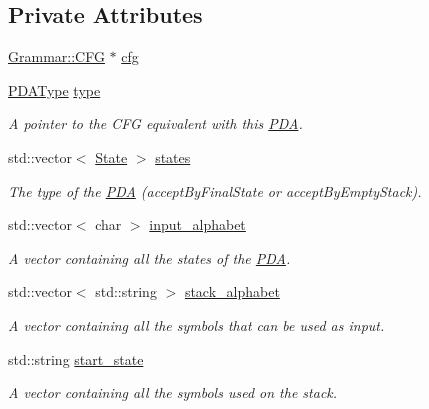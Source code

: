 \subsection*{\-Private \-Attributes}
\begin{DoxyCompactItemize}
\item 
\hyperlink{classGrammar_1_1CFG}{\-Grammar\-::\-C\-F\-G} $\ast$ \hyperlink{classPDA_1_1PDA_af62ce9c2fc33c22ac10cb94be5832cae}{cfg}
\item 
\hyperlink{namespacePDA_a2f2b17cdf30facf6f0fe593ab209acf8}{\-P\-D\-A\-Type} \hyperlink{classPDA_1_1PDA_a15524b46d2be399f384b0f236ccb38f4}{type}
\begin{DoxyCompactList}\small\item\em \-A pointer to the \-C\-F\-G equivalent with this \hyperlink{classPDA_1_1PDA}{\-P\-D\-A}. \end{DoxyCompactList}\item 
std\-::vector$<$ \hyperlink{classPDA_1_1State}{\-State} $>$ \hyperlink{classPDA_1_1PDA_a38d40f2c938f18d396ea2b13ca361271}{states}
\begin{DoxyCompactList}\small\item\em \-The type of the \hyperlink{classPDA_1_1PDA}{\-P\-D\-A} (accept\-By\-Final\-State or accept\-By\-Empty\-Stack). \end{DoxyCompactList}\item 
std\-::vector$<$ char $>$ \hyperlink{classPDA_1_1PDA_a54db260eece0bfe0d5aad0ef13f18a02}{input\-\_\-alphabet}
\begin{DoxyCompactList}\small\item\em \-A vector containing all the states of the \hyperlink{classPDA_1_1PDA}{\-P\-D\-A}. \end{DoxyCompactList}\item 
std\-::vector$<$ std\-::string $>$ \hyperlink{classPDA_1_1PDA_a90a4f96e28003d5bfa4d67b4c7a191b5}{stack\-\_\-alphabet}
\begin{DoxyCompactList}\small\item\em \-A vector containing all the symbols that can be used as input. \end{DoxyCompactList}\item 
std\-::string \hyperlink{classPDA_1_1PDA_af346efb9a6812d704d69299eef9262e6}{start\-\_\-state}
\begin{DoxyCompactList}\small\item\em \-A vector containing all the symbols used on the stack. \end{DoxyCompactList}\item 

\end{DoxyCompactItemize}
